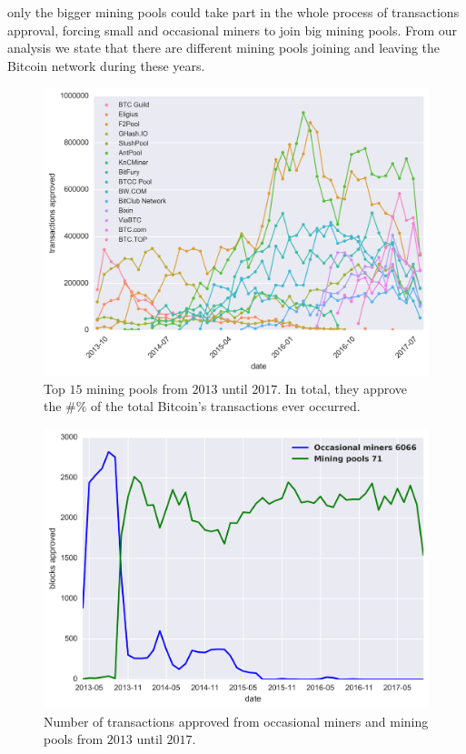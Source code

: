 \documentclass[USenglish]{uit-thesis}
\begin{document}
only the bigger mining pools could take part in the whole
process of transactions approval, forcing small and
occasional miners to join big mining pools.
From our analysis we state that there are different mining pools
joining and leaving the Bitcoin network during these years.
\begin{figure}[h]
	\centering
	\includegraphics[width=1\linewidth]{img/trendy_miners}
	\caption{Top $15$ mining pools from $2013$ until $2017$. In total, they approve the $\#\%$
	of the total Bitcoin's transactions ever occurred.}
	\label{fig:trendy_miners}
\end{figure}
\begin{figure}[h]
	\centering
	\includegraphics[width=1\textwidth]{img/top_miners_monthly}
	\caption{Number of transactions approved from occasional miners and mining pools from $2013$ until $2017$.}
	\label{fig:top_miners_monthly}
\end{figure}
\end{document}
